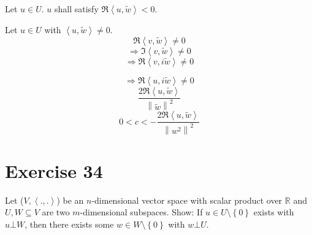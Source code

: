\documentclass[a4paper]{article}
\theoremstyle{definition}
\newcommand\set[1]{\left\{#1\right\}}
\newcommand\fun[1]{\left\langle{#1}\right\rangle}
\newcommand\norm[1]{\left\|{#1}\right\|}
\begin{document}
Let $u \in U$. $u$ shall satisfy $\Re\fun{u,\tilde{w}} < 0$.

Let $u \in U$ with $\fun{u,\tilde{w}} \neq 0$.
\[ \Re\fun{v, \tilde{w}} \neq 0 \]
\[ \Rightarrow \Im\fun{v,\tilde{w}} \neq 0 \]
\[ \Rightarrow \Re{\fun{v, i\tilde{w}}} \neq 0 \]

\[ \Rightarrow \Re{\fun{u, i\tilde{w}}} \neq 0 \]
\[ \frac{2\Re\fun{u,\tilde{w}}}{\norm{\tilde{w}}^2} \]
\[ 0 < c < -\frac{2\Re{\fun{u,\tilde{w}}}}{\norm{w^2}^2} \]


\section{Exercise 34}
\begin{ex}
  Let ($V, \fun{.,.}$) be an $n$-dimensional vector space with scalar product over $\mathbb R$ and
  $U, W \subseteq V$ are two $m$-dimensional subspaces. Show:
  If $u \in U \setminus \set{0}$ exists with $u \bot W$, then there exists some $w \in W \setminus \set{0}$
  with $w \bot U$.
\end{ex}
\end{document}
